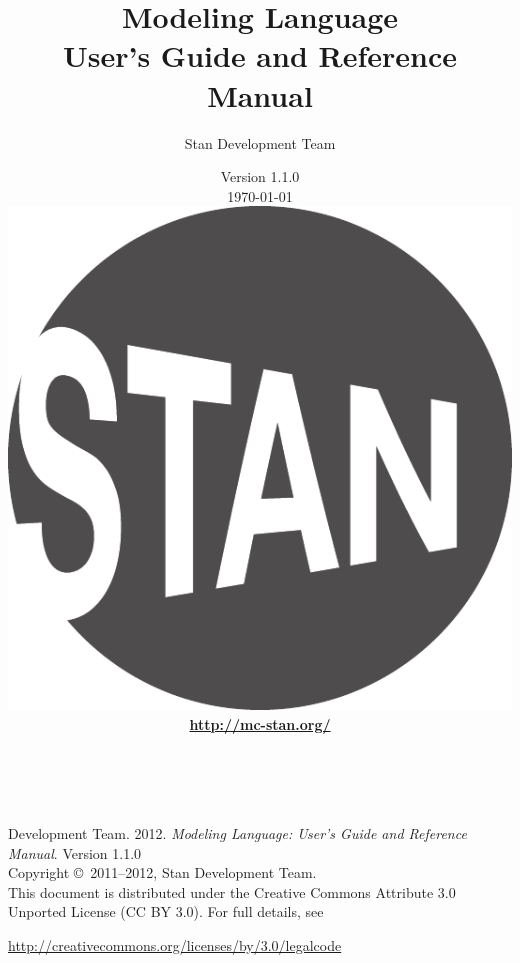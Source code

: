\title{\Huge\bf \Stan Modeling Language \\[4pt] {\LARGE User's Guide
    and Reference Manual}}
\author{Stan Development Team
}

\date{\vspace*{36pt} \Stan Version 1.1.0 \\[4pt] {\small \today}
\\[36pt]
{
\vfill
\includegraphics[width=1.in]{../../../logos/stanlogo-main.pdf}}
\\
\vspace*{6pt}
{\footnotesize\bf \url{http://mc-stan.org/}}
}
\maketitle

\newpage
\thispagestyle{empty}
\mbox{ }
\vfill
\begin{center}
\begin{minipage}[t]{0.75\textwidth}
\small
\Stan Development Team. 2012.  
{\it \Stan Modeling Language: User's Guide and Reference Manual}. Version
1.1.0
\vspace*{20pt}
\mbox{ }
\\
Copyright \copyright \ 2011--2012, Stan Development Team.
\vspace*{28pt}
\mbox{} \\
This document is distributed under the Creative Commons Attribute 3.0
Unported License (CC BY 3.0).  For full details, see
\begin{center}
\url{http://creativecommons.org/licenses/by/3.0/legalcode} 
\end{center}
\end{minipage}
\vspace*{24pt}
\mbox{ }
\end{center}

